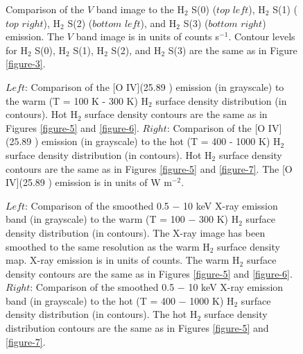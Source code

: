 \documentclass[12pt,preprint]{aastex}
\begin{document}
\clearpage

\begin{figure}
\caption{Comparison of the $V$ band image to the H$_2$ S(0) ($top$ $left$),  
H$_2$ S(1) ($top$ $right$),  H$_2$ S(2) ($bottom$ $left$),  and 
H$_2$ S(3) ($bottom$ $right$) emission.  The $V$ band image is in units 
of counts s$^{-1}$.  Contour levels for H$_2$ S(0), H$_2$ S(1), 
H$_2$ S(2), and H$_2$ S(3) are the same as in Figure \ref{figure-3}.}
\label{figure-14}
\end{figure}

\clearpage

\begin{figure}
\caption{$Left$:  Comparison of the [O IV](25.89 \micron) emission (in grayscale) to 
the warm (T = 100 K - 300 K) H$_2$ surface density distribution (in contours).  
Hot H$_2$ surface density contours are the same as in Figures \ref{figure-5} and \ref{figure-6}.  
$Right$: Comparison of the [O IV](25.89 \micron) emission (in grayscale) to the hot 
(T = 400 - 1000 K) H$_2$ surface density distribution (in contours).  Hot H$_2$ 
surface density contours are the same as in Figures \ref{figure-5} and \ref{figure-7}.  The [O IV](25.89 \micron)
 emission is in units of W $\mathrm{m^{-2}}$.}
\label{figure-15}
\end{figure}

\clearpage

\begin{figure}
\caption{$Left$:  Comparison of the smoothed 0.5 $-$ 10 keV X-ray emission band 
(in grayscale) to the warm (T = 100 $-$ 300 K) H$_2$ surface density distribution 
(in contours).   The X-ray image has been smoothed to the same resolution as the 
warm H$_2$ surface density map.  X-ray emission is in units of counts.  The warm H$_2$ 
surface density contours are the same as in Figures \ref{figure-5} and \ref{figure-6}.  $Right$: 
Comparison of the smoothed 0.5 $-$ 10 keV X-ray emission band (in grayscale) to the hot 
(T = 400 $-$ 1000 K) H$_2$ surface density distribution (in contours).  The hot
H$_2$ surface density distribution contours are the same as in Figures \ref{figure-5} 
and \ref{figure-7}.}
\label{figure-16}
\end{figure}

\clearpage
\end{document}

